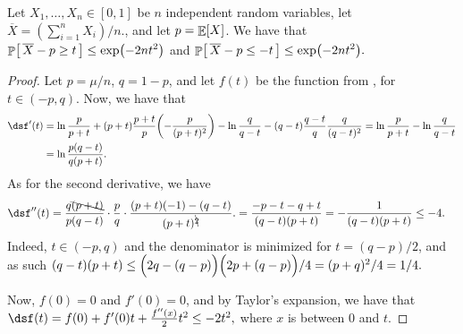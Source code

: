 \begin{theorem}
    Let $X_1, \ldots, X_n \in [0,1]$ be $n$ independent random
    variables, let $\overline{X} = (\sum_{i=1}^n X_i)/n\bigl.$, and
    let $p = \mathop{\mathbb{E}}\!\left[ {X} \right]$. We have that
    \begin{math}%
        \ds%
        \Prob{\bigl.\,\overline{X} - p \geq t\, }%
        \leq%
        \exp\pth{ -2 n t^2}
    \end{math}
    and
    \begin{math}%
        \ds%
        \Prob{\bigl.\, \overline{X} - p \leq -t \, }%
        \leq%
        \exp\pth{ -2 n t^2}.
    \end{math}
\end{theorem}
\begin{proof}
    Let $p = \mu/n$, $q =1-p$, and let $f(t)$ be the function from
    , for $t \in (-p,q)$. Now, we have that
    \begin{align*}
        \ds%
        f'(t)%
        &=%
        \ln \frac{p}{p+t}%
        + (p+t) \frac{p+t}{p} \pth{-\frac{p}{(p+t)^2}}%
        - \ln \frac{q}{q-t}%
        - (q-t)\frac{q-t}{q}\frac{q}{(q-t)^2}%
        =%
        \ln \frac{p}{p+t} - \ln \frac{q}{q-t}%
        \\&%
        =%
        \ln \frac{p(q-t)}{q(p+t)}. %
    \end{align*}
    As for the second derivative, we have
    \begin{align*}
        \ds%
        f''(t)%
        &=%
        \frac{q\bcancel{(p+t)}}{p(q-t)} %
        \cdot \frac{p}{q} \cdot%
        \frac{(p+t)(-1) - (q-t) } {(p+t)^{\bcancel{2}}}. %
        =%
        \frac{-p-t - q+t } {(q-t)(p+t)} %
        =%
        - \frac{1 } {(q-t)(p+t)} %
        \leq%
        -4.
    \end{align*}
    Indeed, $t\in (-p,q)$ and the denominator is minimized for
    $t = (q-p)/2$, and as such
    \begin{math}
        (q-t)(p+t)%
        \leq%
        \pth{\Bigl.2q -(q- p)} \pth{\Bigl. 2p +(q -p)}/4 =%
        (p+q)^2/4 = 1/4.
    \end{math}

    Now, $f(0) =0$ and $f'(0) = 0$, and by Taylor's expansion, we have
    that
    \begin{math}
        \ds%
        f(t) = f(0) + f'(0)t + \frac{f''(x)}{2} t^2 \leq -2 t^2,
    \end{math}
    where $x$ is between $0$ and $t$.


\end{proof}
